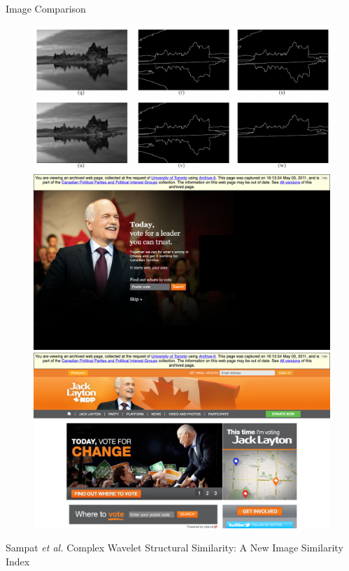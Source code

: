 \documentclass[10pt]{beamer}
\begin{document}
\begin{frame}{Image Comparison}
\begin{figure}
\centering
\includegraphics[scale=0.25]{SSIM}\\
\includegraphics[scale=0.06]{../homepage-images-ndp/52-ndp}
\includegraphics[scale=0.06]{../homepage-images-ndp/53-ndp}
\end{figure}

\footnotesize{Sampat \textit{et al.} Complex Wavelet Structural Similarity: A New Image Similarity Index}
\end{frame}
\end{document}

